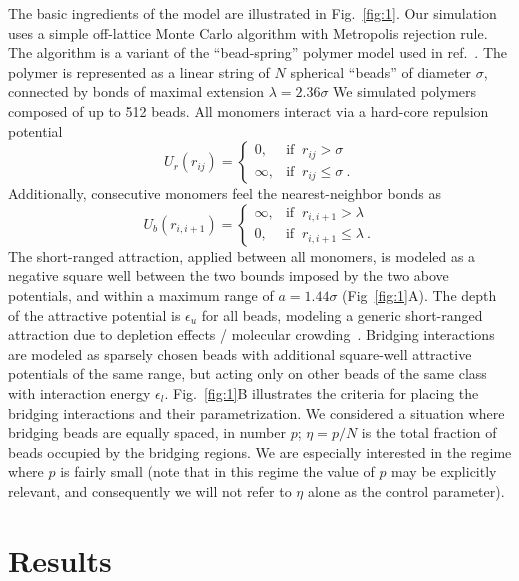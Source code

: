\documentclass[
preprint,
a4paper,
12pt,
superscriptaddress,
pre]{revtex4}
\begin{document}
The basic ingredients of the model are illustrated in
Fig.~\ref{fig:1}. Our simulation uses a simple off-lattice Monte Carlo
algorithm with Metropolis rejection rule. The algorithm is a variant
of the ``bead-spring'' polymer model used in
ref.~\cite{Cacciuto2006}. The polymer is represented as a linear
string of $N$ spherical ``beads'' of diameter $\sigma$, connected by
bonds of maximal extension $\lambda = 2.36 \sigma$
We simulated polymers composed of up to 512 beads.  All monomers
interact via a hard-core repulsion potential
\begin{displaymath}
  U_r(r_{ij}) = \begin{cases} 
    0,  & \mbox{if }\ r_{ij} > \sigma \\ 
    \infty, & \mbox{if }\ r_{ij} \leq \sigma \ . 
  \end{cases} 
\end{displaymath}
Additionally, consecutive monomers feel the nearest-neighbor bonds as 
\begin{displaymath}
  U_b(r_{i,i+1}) = \begin{cases} 
    \infty,  & \mbox{if }\ r_{i,i+1} > \lambda \\ 
    0, & \mbox{if }\ r_{i,i+1} \leq \lambda \ . 
  \end{cases} 
\end{displaymath}
The short-ranged attraction, applied between all monomers, is modeled
as a negative square well between the two bounds imposed by the two
above potentials, and within a maximum range of $a = 1.44 \sigma$
(Fig~\ref{fig:1}A). The depth of the attractive potential is
$\epsilon_u$ for all beads, modeling a generic short-ranged attraction
due to depletion effects / molecular
crowding~\cite{Noro2000}. Bridging interactions are modeled as
sparsely chosen beads with additional square-well attractive
potentials of the same range, but acting only on other beads of the
same class with interaction energy $\epsilon_l$.
%
Fig.~\ref{fig:1}B illustrates the criteria for placing the bridging
interactions and their parametrization. We considered a situation
where bridging beads are equally spaced, in number $p$;  $\eta=p/N$ is
the total fraction of beads occupied by the bridging regions. We are
especially interested in the regime where $p$ is fairly small (note
that in this regime the value of $p$ may be explicitly relevant, and
consequently we will not refer to $\eta$ alone as the control
parameter). 



\section{Results}
\end{document}
